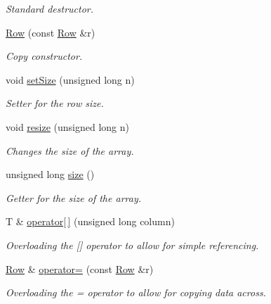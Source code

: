 \begin{DoxyCompactItemize}
\begin{DoxyCompactList}\small\item\em Standard destructor. \end{DoxyCompactList}\item 
\hyperlink{class_row_a3c76905ddd4522c92da0d8a9e24a22a1}{Row} (const \hyperlink{class_row}{Row} \&r)
\begin{DoxyCompactList}\small\item\em Copy constructor. \end{DoxyCompactList}\item 
void \hyperlink{class_row_a4015d3cc7a22a4a4ad31ae410ab8fce4}{set\+Size} (unsigned long n)
\begin{DoxyCompactList}\small\item\em Setter for the row size. \end{DoxyCompactList}\item 
void \hyperlink{class_row_aac3e65388e6ce2a003be1a1b460fab53}{resize} (unsigned long n)
\begin{DoxyCompactList}\small\item\em Changes the size of the array. \end{DoxyCompactList}\item 
unsigned long \hyperlink{class_row_a5fdbcb2478b0ff00d12b8b109b0eb89a}{size} ()
\begin{DoxyCompactList}\small\item\em Getter for the size of the array. \end{DoxyCompactList}\item 
T \& \hyperlink{class_row_aecb642c8ceffbb7d6c69bc13d9de4bb0}{operator\mbox{[}$\,$\mbox{]}} (unsigned long column)
\begin{DoxyCompactList}\small\item\em Overloading the \mbox{[}\mbox{]} operator to allow for simple referencing. \end{DoxyCompactList}\item 
\hyperlink{class_row}{Row} \& \hyperlink{class_row_a877484e061eef2a179cc28d30b3ec542}{operator=} (const \hyperlink{class_row}{Row} \&r)
\begin{DoxyCompactList}\small\item\em Overloading the = operator to allow for copying data across. \end{DoxyCompactList}\end{DoxyCompactItemize}
